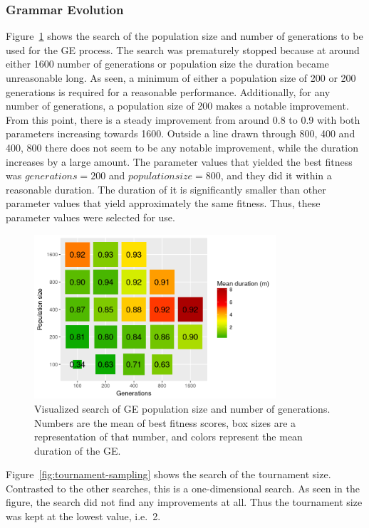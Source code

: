 \subsubsection{Grammar Evolution}
Figure~\ref{fig:size-sampling} shows the search of the population size and number of generations to be used for the GE process.
The search was prematurely stopped because at around either 1600 number of generations or population size the duration became unreasonable long.
As seen, a minimum of either a population size of 200 or 200 generations is required for a reasonable performance.
Additionally, for any number of generations, a population size of 200 makes a notable improvement.
From this point, there is a steady improvement from around 0.8 to 0.9 with both parameters increasing towards 1600.
Outside a line drawn through 800, 400 and 400, 800 there does not seem to be any notable improvement, while the duration increases by a large amount.
The parameter values that yielded the best fitness was $generations = 200$ and $population size = 800$, and they did it within a reasonable duration.
The duration of it is significantly smaller than other parameter values that yield approximately the same fitness.
Thus, these parameter values were selected for use.

\begin{figure}
    \centering
    \includegraphics[width=0.8\textwidth]{figures/ge-size-sampling}
    \caption[Visualized search of GE population size and number of generations]{Visualized search of GE population size and number of generations. Numbers are the mean of best fitness scores, box sizes are a representation of that number, and colors represent the mean duration of the GE.}
    \label{fig:size-sampling}
\end{figure}

Figure~\ref{fig:tournament-sampling} shows the search of the tournament size.
Contrasted to the other searches, this is a one-dimensional search.
As seen in the figure, the search did not find any improvements at all.
Thus the tournament size was kept at the lowest value, i.e.\ 2.

